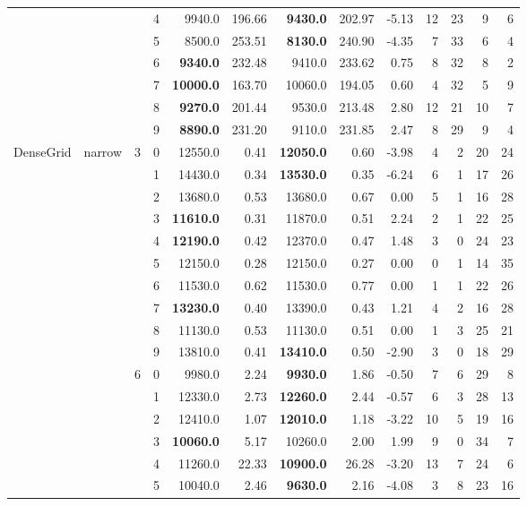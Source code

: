 {\begin{longtable}{llcc|rr|rrr|rrrr}
 &  &  & 4 & 9940.0 & 196.66 & \textbf{9430.0} & 202.97 & -5.13 & 12 & 23 & 9 & 6 \\
 &  &  & 5 & 8500.0 & 253.51 & \textbf{8130.0} & 240.90 & -4.35 & 7 & 33 & 6 & 4 \\
 &  &  & 6 & \textbf{9340.0} & 232.48 & 9410.0 & 233.62 & 0.75 & 8 & 32 & 8 & 2 \\
 &  &  & 7 & \textbf{10000.0} & 163.70 & 10060.0 & 194.05 & 0.60 & 4 & 32 & 5 & 9 \\
 &  &  & 8 & \textbf{9270.0} & 201.44 & 9530.0 & 213.48 & 2.80 & 12 & 21 & 10 & 7 \\
 &  &  & 9 & \textbf{8890.0} & 231.20 & 9110.0 & 231.85 & 2.47 & 8 & 29 & 9 & 4 \\
DenseGrid & narrow & 3 & 0 & 12550.0 & 0.41 & \textbf{12050.0} & 0.60 & -3.98 & 4 & 2 & 20 & 24 \\
 &  &  & 1 & 14430.0 & 0.34 & \textbf{13530.0} & 0.35 & -6.24 & 6 & 1 & 17 & 26 \\
 &  &  & 2 & 13680.0 & 0.53 & 13680.0 & 0.67 & 0.00 & 5 & 1 & 16 & 28 \\
 &  &  & 3 & \textbf{11610.0} & 0.31 & 11870.0 & 0.51 & 2.24 & 2 & 1 & 22 & 25 \\
 &  &  & 4 & \textbf{12190.0} & 0.42 & 12370.0 & 0.47 & 1.48 & 3 & 0 & 24 & 23 \\
 &  &  & 5 & 12150.0 & 0.28 & 12150.0 & 0.27 & 0.00 & 0 & 1 & 14 & 35 \\
 &  &  & 6 & 11530.0 & 0.62 & 11530.0 & 0.77 & 0.00 & 1 & 1 & 22 & 26 \\
 &  &  & 7 & \textbf{13230.0} & 0.40 & 13390.0 & 0.43 & 1.21 & 4 & 2 & 16 & 28 \\
 &  &  & 8 & 11130.0 & 0.53 & 11130.0 & 0.51 & 0.00 & 1 & 3 & 25 & 21 \\
 &  &  & 9 & 13810.0 & 0.41 & \textbf{13410.0} & 0.50 & -2.90 & 3 & 0 & 18 & 29 \\ \hline
 &  & 6 & 0 & 9980.0 & 2.24 & \textbf{9930.0} & 1.86 & -0.50 & 7 & 6 & 29 & 8 \\
 &  &  & 1 & 12330.0 & 2.73 & \textbf{12260.0} & 2.44 & -0.57 & 6 & 3 & 28 & 13 \\
 &  &  & 2 & 12410.0 & 1.07 & \textbf{12010.0} & 1.18 & -3.22 & 10 & 5 & 19 & 16 \\
 &  &  & 3 & \textbf{10060.0} & 5.17 & 10260.0 & 2.00 & 1.99 & 9 & 0 & 34 & 7 \\
 &  &  & 4 & 11260.0 & 22.33 & \textbf{10900.0} & 26.28 & -3.20 & 13 & 7 & 24 & 6 \\
 &  &  & 5 & 10040.0 & 2.46 & \textbf{9630.0} & 2.16 & -4.08 & 3 & 8 & 23 & 16 \\

\end{longtable}}
